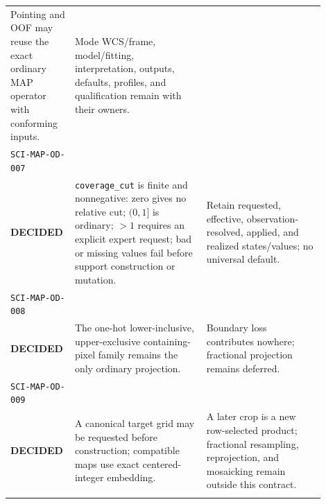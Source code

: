 \begin{longtable}{L{0.14\linewidth}L{0.40\linewidth}L{0.36\linewidth}}
Pointing and OOF may reuse the exact ordinary MAP operator with conforming
inputs. &
Mode WCS/frame, model/fitting, interpretation, outputs, defaults, profiles,
and qualification remain with their owners.\\
\addlinespace[0.35em]
\texttt{SCI-MAP-OD-007}\\\textbf{DECIDED} &
\texttt{coverage\_cut} is finite and nonnegative: zero gives no relative cut;
\((0,1]\) is ordinary; \(>1\) requires an explicit expert request; bad or
missing values fail before support construction or mutation. &
Retain requested, effective, observation-resolved, applied, and realized states/values;
no universal default.\\
\addlinespace[0.35em]
\texttt{SCI-MAP-OD-008}\\\textbf{DECIDED} &
The one-hot lower-inclusive, upper-exclusive containing-pixel family remains
the only ordinary projection. &
Boundary loss contributes nowhere; fractional projection remains deferred.\\
\addlinespace[0.35em]
\texttt{SCI-MAP-OD-009}\\\textbf{DECIDED} &
A canonical target grid may be requested before construction; compatible maps
use exact centered-integer embedding. &
A later crop is a new row-selected product; fractional resampling,
reprojection, and mosaicking remain outside this contract.\\
\addlinespace[0.35em]
\bottomrule
\end{longtable}
\endgroup
